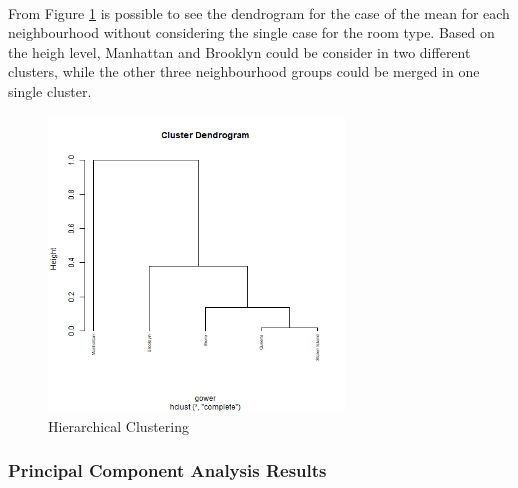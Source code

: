 \documentclass{FR16}
\begin{document}
\\
\noindent From Figure \ref{fig:28} is possible to see the dendrogram  for the case of the mean for each neighbourhood without considering the single case for the room type. Based on the heigh level, Manhattan and Brooklyn could be consider in two different clusters, while the other three neighbourhood groups could be merged in one single cluster.



\begin{figure}[h]
  \centering
    \includegraphics[width=0.7\textwidth]{figures/hc3.PNG} 
 \caption{\label{fig:28} Hierarchical Clustering}
\end{figure}

\newpage
\noindent \subsubsection{Principal Component Analysis Results}
\end{document}
